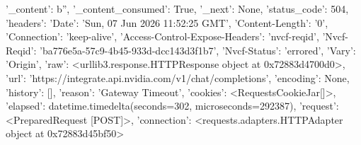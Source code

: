 
{'_content': b'', '_content_consumed': True, '_next': None, 'status_code': 504, 'headers': {'Date': 'Sun, 07 Jun 2026 11:52:25 GMT', 'Content-Length': '0', 'Connection': 'keep-alive', 'Access-Control-Expose-Headers': 'nvcf-reqid', 'Nvcf-Reqid': 'ba776e5a-57c9-4b45-933d-dcc143d3f1b7', 'Nvcf-Status': 'errored', 'Vary': 'Origin'}, 'raw': <urllib3.response.HTTPResponse object at 0x72883d4700d0>, 'url': 'https://integrate.api.nvidia.com/v1/chat/completions', 'encoding': None, 'history': [], 'reason': 'Gateway Timeout', 'cookies': <RequestsCookieJar[]>, 'elapsed': datetime.timedelta(seconds=302, microseconds=292387), 'request': <PreparedRequest [POST]>, 'connection': <requests.adapters.HTTPAdapter object at 0x72883d45bf50>}
